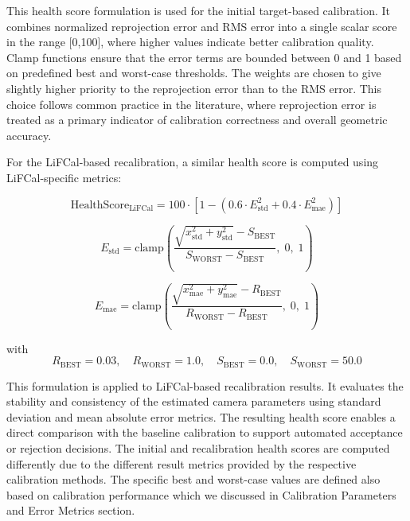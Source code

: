 \documentclass[12pt]{scrartcl}
\begin{document}
This health score formulation is used for the initial target-based calibration. It combines normalized reprojection error and RMS error into a single scalar score in the range [0,100], where higher values indicate better calibration quality. Clamp functions ensure that the error terms are bounded between 0 and 1 based on predefined best and worst-case thresholds. The weights are chosen to give slightly higher priority to the reprojection error than to the RMS error. This choice follows common practice in the literature, where reprojection error is treated as a primary indicator of calibration correctness and overall geometric accuracy.
\newline

For the LiFCal-based recalibration, a similar health score is computed using LiFCal-specific metrics:

\begin{equation}
\text{HealthScore}_{\text{LiFCal}} =
100 \cdot \left[ 1 -
\left( 0.6 \cdot E_{\text{std}}^{2}
+ 0.4 \cdot E_{\text{mae}}^{2} \right) \right]
\end{equation}
\vspace{0.1cm}


\begin{equation}
E_{\text{std}} =
\mathrm{clamp}\!\left(
\frac{
\sqrt{x_{\text{std}}^{2} + y_{\text{std}}^{2}} - S_{\text{BEST}}
}
{S_{\text{WORST}} - S_{\text{BEST}}},\; 0,\; 1
\right)
\end{equation}
\vspace{0.1cm}


\begin{equation}
E_{\text{mae}} =
\mathrm{clamp}\!\left(
\frac{
\sqrt{x_{\text{mae}}^{2} + y_{\text{mae}}^{2}} - R_{\text{BEST}}
}
{R_{\text{WORST}} - R_{\text{BEST}}},\; 0,\; 1
\right)
\end{equation}
\vspace{0.1cm}


with
\[
R_{\text{BEST}} = 0.03,\quad
R_{\text{WORST}} = 1.0,\quad
S_{\text{BEST}} = 0.0,\quad
S_{\text{WORST}} = 50.0
\]
\vspace{0.05cm}

This formulation is applied to LiFCal-based recalibration results. It evaluates the stability and consistency of the estimated camera parameters using standard deviation and mean absolute error metrics. The resulting health score enables a direct comparison with the baseline calibration to support automated acceptance or rejection decisions. The initial and recalibration health scores are computed differently due to the different result metrics provided by the respective calibration methods. The specific best and worst-case values are defined also based on calibration performance which we discussed in Calibration Parameters and Error Metrics section.
\end{document}
